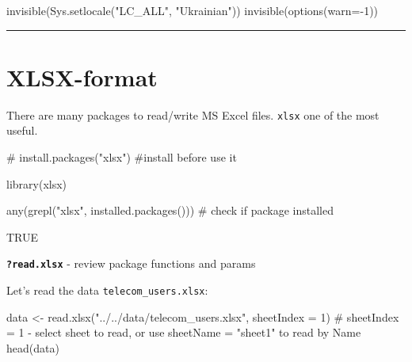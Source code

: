 \documentclass[
  letterpaper,
  DIV=11,
  numbers=noendperiod]{scrreprt}
\newenvironment{Shaded}{\begin{snugshade}}{\end{snugshade}}
\newcommand{\AttributeTok}[1]{\textcolor[rgb]{0.40,0.45,0.13}{#1}}
\newcommand{\CommentTok}[1]{\textcolor[rgb]{0.37,0.37,0.37}{#1}}
\newcommand{\DecValTok}[1]{\textcolor[rgb]{0.68,0.00,0.00}{#1}}
\newcommand{\FunctionTok}[1]{\textcolor[rgb]{0.28,0.35,0.67}{#1}}
\newcommand{\NormalTok}[1]{\textcolor[rgb]{0.00,0.23,0.31}{#1}}
\newcommand{\OtherTok}[1]{\textcolor[rgb]{0.00,0.23,0.31}{#1}}
\newcommand{\SpecialCharTok}[1]{\textcolor[rgb]{0.37,0.37,0.37}{#1}}
\newcommand{\StringTok}[1]{\textcolor[rgb]{0.13,0.47,0.30}{#1}}
\begin{document}
\begin{Shaded}
\begin{Highlighting}[]
\FunctionTok{invisible}\NormalTok{(}\FunctionTok{Sys.setlocale}\NormalTok{(}\StringTok{"LC\_ALL"}\NormalTok{, }\StringTok{"Ukrainian"}\NormalTok{))}
\FunctionTok{invisible}\NormalTok{(}\FunctionTok{options}\NormalTok{(}\AttributeTok{warn=}\SpecialCharTok{{-}}\DecValTok{1}\NormalTok{))}
\end{Highlighting}
\end{Shaded}

\begin{center}\rule{0.5\linewidth}{0.5pt}\end{center}

\section{XLSX-format}\label{xlsx-format}

There are many packages to read/write MS Excel files. \texttt{xlsx} one
of the most useful.

\begin{Shaded}
\begin{Highlighting}[]
\CommentTok{\# install.packages("xlsx") \#install before use it}
\end{Highlighting}
\end{Shaded}

\begin{Shaded}
\begin{Highlighting}[]
\FunctionTok{library}\NormalTok{(xlsx)}
\end{Highlighting}
\end{Shaded}

\begin{Shaded}
\begin{Highlighting}[]
\FunctionTok{any}\NormalTok{(}\FunctionTok{grepl}\NormalTok{(}\StringTok{"xlsx"}\NormalTok{, }\FunctionTok{installed.packages}\NormalTok{())) }\CommentTok{\# check if package installed}
\end{Highlighting}
\end{Shaded}

TRUE

\textbf{\texttt{?read.xlsx}} - review package functions and params

Let's read the data \texttt{telecom\_users.xlsx}:

\begin{Shaded}
\begin{Highlighting}[]
\NormalTok{data }\OtherTok{\textless{}{-}} \FunctionTok{read.xlsx}\NormalTok{(}\StringTok{"../../data/telecom\_users.xlsx"}\NormalTok{, }\AttributeTok{sheetIndex =} \DecValTok{1}\NormalTok{)}
\CommentTok{\# sheetIndex = 1 {-} select sheet to read, or use sheetName = "sheet1" to read by Name}
\FunctionTok{head}\NormalTok{(data)}
\end{Highlighting}
\end{Shaded}
\end{document}
